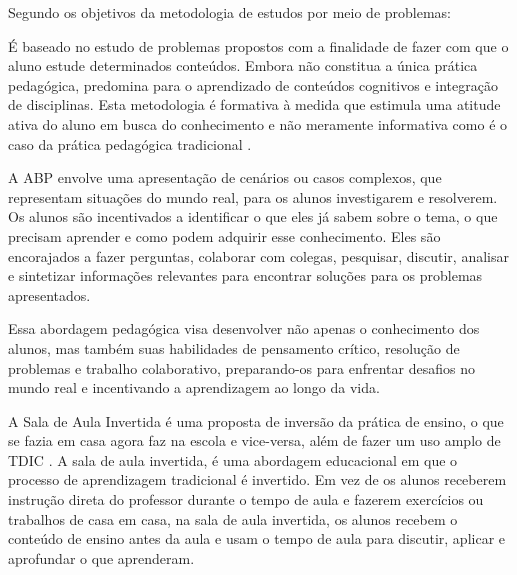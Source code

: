 Segundo  os objetivos da metodologia de estudos por meio de problemas:

\begin{citacao}
    É baseado no estudo de problemas propostos com a finalidade de fazer com que o aluno estude determinados conteúdos. Embora não constitua a única prática pedagógica, predomina para o aprendizado de conteúdos cognitivos e integração de disciplinas. Esta metodologia é formativa à medida que estimula uma atitude ativa do aluno em busca do conhecimento e não meramente informativa como é o caso da prática pedagógica tradicional \cite[p. 50]{TANGERINO2017}.
\end{citacao}

A ABP envolve uma apresentação de cenários ou casos complexos, que representam situações do mundo real, para os alunos investigarem e resolverem. Os alunos são incentivados a identificar o que eles já sabem sobre o tema, o que precisam aprender e como podem adquirir esse conhecimento. Eles são encorajados a fazer perguntas, colaborar com colegas, pesquisar, discutir, analisar e sintetizar informações relevantes para encontrar soluções para os problemas apresentados.


Essa abordagem pedagógica visa desenvolver não apenas o conhecimento dos alunos, mas também suas habilidades de pensamento crítico, resolução de problemas e trabalho colaborativo, preparando-os para enfrentar desafios no mundo real e incentivando a aprendizagem ao longo da vida.

A Sala de Aula Invertida é uma proposta de inversão da prática de ensino, o que se fazia em casa agora faz na escola e vice-versa, além de fazer um uso amplo de TDIC \cite{BERGMANNSANS2016}. A sala de aula invertida, é uma abordagem educacional em que o processo de aprendizagem tradicional é invertido. Em vez de os alunos receberem instrução direta do professor durante o tempo de aula e fazerem exercícios ou trabalhos de casa em casa, na sala de aula invertida, os alunos recebem o conteúdo de ensino antes da aula e usam o tempo de aula para discutir, aplicar e aprofundar o que aprenderam.

